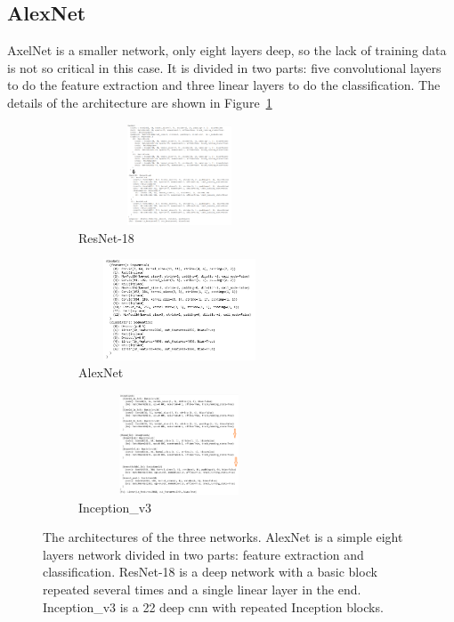\subsection{AlexNet}
AxelNet is a smaller network, only eight layers deep, so the lack of training data is not so critical in this case. It is divided in two parts: five convolutional layers to do the feature extraction and three linear layers to do the classification.  The details of the architecture are shown in Figure~\ref{fig:resarchi}
\begin{figure}
\begin{subfigure}{.5\textwidth}
  \centering
  \includegraphics[width=6cm, height=3cm]{figures/03-Resnet_architecture.png}
  \caption{ResNet-18}
  \label{fig:resarchi}
\end{subfigure}%
\begin{subfigure}{.5\textwidth}
  \centering
  \includegraphics[width=6cm, height=3cm]{figures/03-alexnet_architecture}
  \caption{AlexNet}
  \label{fig:alexarchi}
\end{subfigure}
\begin{subfigure}{.5\textwidth}
  \centering
  \includegraphics[width=6cm, height=3cm]{figures/03-inception_architecture}
  \caption{Inception\_v3}
  \label{fig:googarch}
\end{subfigure}
\caption[Networks architectures]{The architectures of the three networks. AlexNet is a simple eight layers network divided in two parts: feature extraction and classification. ResNet-18 is a deep network with a basic block repeated several times and a single linear layer in the end. Inception\_v3 is a 22 deep \gls{cnn} with repeated Inception blocks.}
\end{figure}

